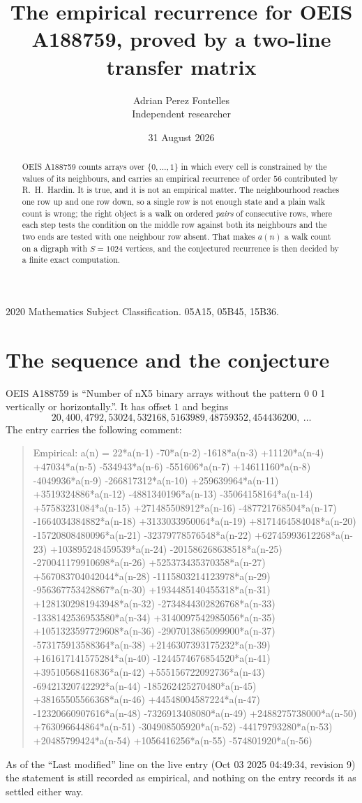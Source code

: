 \documentclass[11pt,a4paper]{article}
\title{The empirical recurrence for OEIS A188759, proved by a two-line transfer matrix}
\author{Adrian Perez Fontelles\\ \small Independent researcher}
\date{31 August 2026}
\theoremstyle{plain}
\theoremstyle{definition}
\begin{document}
\maketitle

\begin{abstract}
OEIS A188759 counts arrays over $\{0,\dots,1\}$ in which every cell is constrained by the
values of its neighbours, and carries an empirical recurrence of order $56$ contributed
by R.~H.~Hardin. It is true, and it is not an empirical matter. The neighbourhood reaches one
row up and one row down, so a single row is not enough state and a plain walk count
is wrong; the right object is a walk on ordered \emph{pairs} of consecutive rows, where
each step tests the condition on the middle row against both its neighbours and the two
ends are tested with one neighbour row absent. That makes $a(n)$ a walk count on a digraph
with $S=1024$ vertices, and the conjectured recurrence is then decided by a finite exact
computation.
\end{abstract}

\noindent\small 2020 Mathematics Subject Classification. 05A15, 05B45, 15B36.\normalsize

\section{The sequence and the conjecture}

OEIS A188759 is ``Number of nX5 binary arrays without the pattern 0 0 1 vertically or horizontally.''. It has offset $1$ and begins
\[
20, 400, 4792, 53024, 532168, 5163989, 48759352, 454436200,\ \dots
\]
The entry carries the following comment:
\begin{quote}\small
Empirical: a(n) = 22*a(n-1) -70*a(n-2) -1618*a(n-3) +11120*a(n-4) +47034*a(n-5) -534943*a(n-6) -551606*a(n-7) +14611160*a(n-8) -4049936*a(n-9) -266817312*a(n-10) +259639964*a(n-11) +3519324886*a(n-12) -4881340196*a(n-13) -35064158164*a(n-14) +57583231084*a(n-15) +271485508912*a(n-16) -487721768504*a(n-17) -1664034384882*a(n-18) +3133033950064*a(n-19) +8171464584048*a(n-20) -15720808480096*a(n-21) -32379778576548*a(n-22) +62745993612268*a(n-23) +103895248459539*a(n-24) -201586268638518*a(n-25) -270041179910698*a(n-26) +525373435370358*a(n-27) +567083704042044*a(n-28) -1115803214123978*a(n-29) -956367753428867*a(n-30) +1934485140455318*a(n-31) +1281302981943948*a(n-32) -2734844302826768*a(n-33) -1338142536953580*a(n-34) +3140097542985056*a(n-35) +1051323597729608*a(n-36) -2907013865099900*a(n-37) -573175913588364*a(n-38) +2146307393175232*a(n-39) +161617141575284*a(n-40) -1244574676854520*a(n-41) +39510568416836*a(n-42) +555156722092736*a(n-43) -69421320742292*a(n-44) -185262425270480*a(n-45) +38165505566368*a(n-46) +44548004587224*a(n-47) -12320660907616*a(n-48) -7326913408080*a(n-49) +2488275738000*a(n-50) +763096644864*a(n-51) -304908505920*a(n-52) -44179793280*a(n-53) +20485799424*a(n-54) +1056416256*a(n-55) -574801920*a(n-56)
\end{quote}
As of the ``Last modified'' line on the live entry (Oct 03 2025 04:49:34, revision 9) the statement is
still recorded as empirical, and nothing on the entry records it as settled either way.
\end{document}
